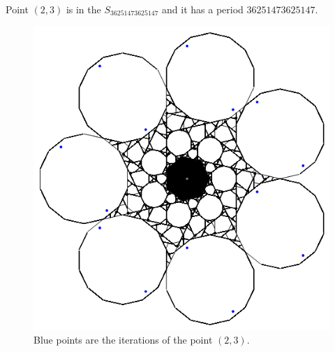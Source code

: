 \documentclass[a4paper, 12pt]{article}
\begin{document}
Point $(2, 3)$ is in the $S_{36251473625147}$ and it has a period ${36251473625147}$.

\begin{figure}[h!]
    \centering
    \includegraphics[width=0.6\linewidth]{(2,3).png}
    \caption{Blue points are the iterations of the point $(2, 3)$.}
    \label{fig:my_label}
\end{figure}


\newpage
\end{document}
